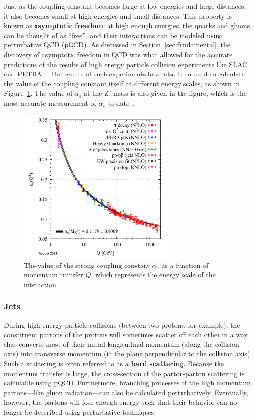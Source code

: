 Just as the coupling constant becomes large at low energies and large distances, it also becomes small at high energies and small distances. This property is known as \textbf{asymptotic freedom}: at high enough energies, the quarks and gluons can be thought of as ``free'', and their interactions can be modeled using perturbative QCD (pQCD). As discussed in Section~\ref{sec:fundamental}, the discovery of asymptotic freedom in QCD was what allowed for the accurate predictions of the results of high energy particle collision experiments like SLAC~\cite{SLAC} and PETRA~\cite{PETRA}. The results of such experiments have also been used to calculate the value of the coupling constant itself at different energy scales, as shown in Figure~\ref{fig:asymptotic_freedom}. The value of $\alpha_s$ at the Z$^0$ mass is also given in the figure, which is the most accurate measurement of $\alpha_s$ to date~\cite{PDG}. 

\begin{figure}
    \centering
    \includegraphics[width=0.7\textwidth]{figures/introduction/running_coupling.png}
    \caption{The value of the strong coupling constant $\alpha_s$ as a function of momentum transfer $Q$, which represents the energy scale of the interaction.}
    \label{fig:asymptotic_freedom}
\end{figure}


\subsubsection{Jets}
\label{sec:jets}

During high energy particle collisions (between two protons, for example), the constituent partons of the protons will sometimes scatter off each other in a way that converts most of their initial longitudinal momentum (along the collision axis) into transverse momentum (in the plane perpendicular to the collision axis). Such a scattering is often referred to as a \textbf{hard scattering}. Because the momentum transfer is large, the cross-section of the parton-parton scattering is calculable using pQCD. Furthermore, branching processes of the high momentum partons---like gluon radiation---can also be calculated perturbatively. Eventually, however, the partons will lose enough energy such that their behavior can no longer be described using perturbative techniques.

